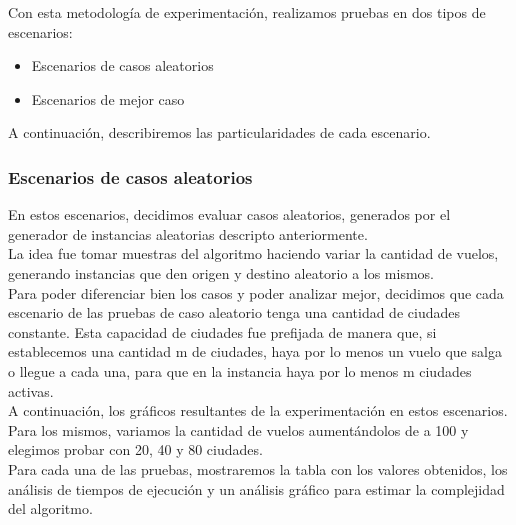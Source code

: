 \documentclass[10pt,a4paper]{article}
\begin{document}
\noindent Con esta metodología de experimentación, realizamos pruebas en dos tipos de escenarios:\\
\noindent \begin{itemize}
\item Escenarios de casos aleatorios
\item Escenarios de mejor caso\\
\end{itemize}

\noindent A continuación, describiremos las particularidades de cada escenario.


\subsubsection{Escenarios de casos aleatorios}

\noindent En estos escenarios, decidimos evaluar casos aleatorios, generados por el generador de instancias aleatorias descripto anteriormente.\\

\noindent La idea fue tomar muestras del algoritmo haciendo variar la cantidad de vuelos, generando instancias que den origen y destino aleatorio a los mismos.\\

\noindent Para poder diferenciar bien los casos y poder analizar mejor, decidimos que cada escenario de las pruebas de caso aleatorio tenga una cantidad de ciudades constante. Esta capacidad de ciudades fue prefijada de manera que, si establecemos una cantidad m de ciudades, haya por lo menos un vuelo que salga o llegue a cada una, para que en la instancia haya por lo menos m ciudades activas.\\

\noindent A continuación, los gráficos resultantes de la experimentación en estos escenarios. Para los mismos, variamos la cantidad de vuelos aumentándolos de a 100 y elegimos probar con 20, 40 y 80 ciudades.\\

\noindent Para cada una de las pruebas, mostraremos la tabla con los valores obtenidos, los análisis de tiempos de ejecución y un análisis gráfico para estimar la complejidad del algoritmo.\\
\end{document}
